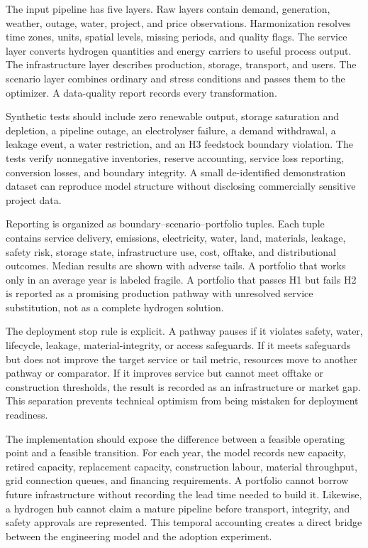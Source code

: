 \documentclass[conference]{IEEEtran}
\begin{document}
The input pipeline has five layers. Raw layers contain demand, generation, weather, outage, water, project, and price observations. Harmonization resolves time zones, units, spatial levels, missing periods, and quality flags. The service layer converts hydrogen quantities and energy carriers to useful process output. The infrastructure layer describes production, storage, transport, and users. The scenario layer combines ordinary and stress conditions and passes them to the optimizer. A data-quality report records every transformation.

Synthetic tests should include zero renewable output, storage saturation and depletion, a pipeline outage, an electrolyser failure, a demand withdrawal, a leakage event, a water restriction, and an H3 feedstock boundary violation. The tests verify nonnegative inventories, reserve accounting, service loss reporting, conversion losses, and boundary integrity. A small de-identified demonstration dataset can reproduce model structure without disclosing commercially sensitive project data.

Reporting is organized as boundary--scenario--portfolio tuples. Each tuple contains service delivery, emissions, electricity, water, land, materials, leakage, safety risk, storage state, infrastructure use, cost, offtake, and distributional outcomes. Median results are shown with adverse tails. A portfolio that works only in an average year is labeled fragile. A portfolio that passes H1 but fails H2 is reported as a promising production pathway with unresolved service substitution, not as a complete hydrogen solution.

The deployment stop rule is explicit. A pathway pauses if it violates safety, water, lifecycle, leakage, material-integrity, or access safeguards. If it meets safeguards but does not improve the target service or tail metric, resources move to another pathway or comparator. If it improves service but cannot meet offtake or construction thresholds, the result is recorded as an infrastructure or market gap. This separation prevents technical optimism from being mistaken for deployment readiness.

The implementation should expose the difference between a feasible operating point and a feasible transition. For each year, the model records new capacity, retired capacity, replacement capacity, construction labour, material throughput, grid connection queues, and financing requirements. A portfolio cannot borrow future infrastructure without recording the lead time needed to build it. Likewise, a hydrogen hub cannot claim a mature pipeline before transport, integrity, and safety approvals are represented. This temporal accounting creates a direct bridge between the engineering model and the adoption experiment.
\end{document}
